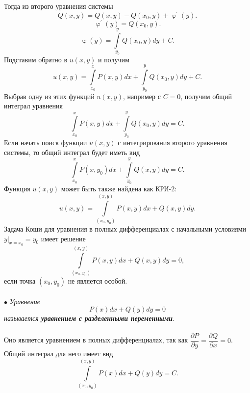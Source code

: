 \documentclass[a4paper, 12pt]{report}
\renewcommand{\varphi}{\upvarphi}
\renewcommand{\d}{\partial}
\begin{document}
Тогда из второго уравнения системы $$Q(x,y) = Q(x,y) - Q(x_0,y) + \varphi^\prime(y).$$
$$\varphi^\prime(y) = Q(x_0,y).$$
$$\varphi(y) = \int\limits_{y_0}^y Q(x_0,y)dy + C.$$
Подставим обратно в $u(x,y)$ и получим $$u(x,y) =\int\limits^x_{x_0}P(x,y)dx  +  \int\limits_{y_0}^y Q(x_0,y)dy + C.$$
Выбрав одну из этих функций $u(x,y)$, например с $C = 0$, получим общий интеграл уравнения $$\int\limits^x_{x_0}P(x,y)dx  +  \int\limits_{y_0}^y Q(x_0,y)dy = C.$$
Если начать поиск функции $u(x,y)$ с интегрирования второго уравнения системы, то общий интеграл будет иметь вид $$\int\limits^x_{x_0}P(x,y_0)dx  +  \int\limits_{y_0}^y Q(x,y)dy = C.$$
Функция $u(x,y)$ может быть также найдена как КРИ-2: $$u(x,y) = \int\limits_{(x_0,y_0)}^{(x,y)}P(x,y)dx + Q(x,y) dy.$$
Задача Кощи для уравнения в полных дифференциалах с начальными условиями $y|_{x=x_0} = y_0$ имеет решение $$\int\limits_{(x_0,y_0)}^{(x,y)}P(x,y)dx + Q(x,y) dy = 0,$$
если точка $(x_0,y_0)$ не является особой.\\\\
$\bullet$ \textit{Уравнение $$P(x)dx + Q(y)dy = 0$$ называется \textbf{уравнением с разделенными переменными}.}\\\\
Оно является уравнением в полных дифференциалах, так как $\dfrac{\d P}{\d y} = \dfrac{\d Q}{\d x} = 0$. Общий интеграл для него имеет вид $$\int\limits_{(x_0,y_0)}^{(x,y)}P(x)dx + Q(y) dy = C.$$
\end{document}
